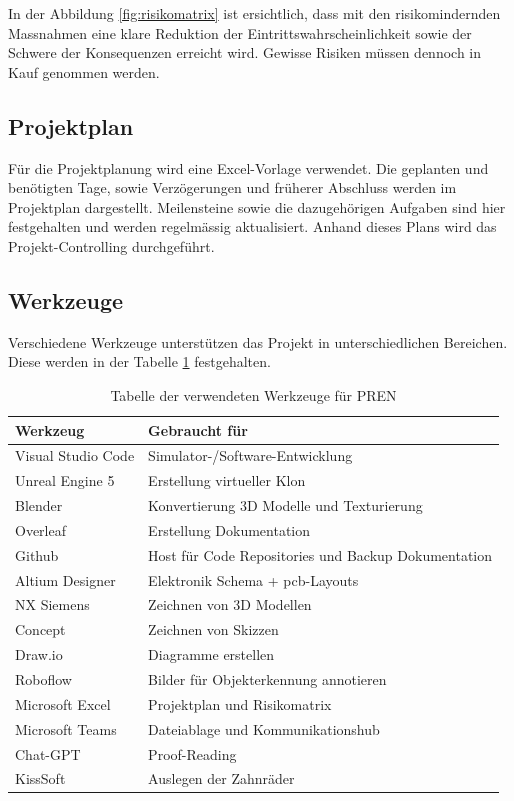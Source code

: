 \documentclass[../main.tex]{subfiles}
\begin{document}
In der Abbildung \ref{fig:risikomatrix} ist ersichtlich, dass mit den risikomindernden Massnahmen eine klare Reduktion der Eintrittswahrscheinlichkeit sowie der Schwere der Konsequenzen erreicht wird. Gewisse Risiken müssen dennoch in Kauf genommen werden.

\subsection{Projektplan}
Für die Projektplanung wird eine Excel-Vorlage verwendet. Die geplanten und benötigten Tage, sowie Verzögerungen und früherer Abschluss werden im Projektplan dargestellt. Meilensteine sowie die dazugehörigen Aufgaben sind hier festgehalten und werden regelmässig aktualisiert. Anhand dieses Plans wird das Projekt-Controlling durchgeführt.


\subsection{Werkzeuge}

Verschiedene Werkzeuge unterstützen das Projekt in unterschiedlichen Bereichen. Diese werden in der Tabelle \ref{tab:werkzeugtabelle} festgehalten.

\begin{table}[H]
\centering
\begin{tabular}{|l|l|}
\hline
\textbf{Werkzeug} & \textbf{Gebraucht für} \\ \hline
Visual Studio Code & Simulator-/Software-Entwicklung \\ \hline
Unreal Engine 5 & Erstellung virtueller Klon \\ \hline
Blender & Konvertierung 3D Modelle und Texturierung \\ \hline
Overleaf & Erstellung Dokumentation \\ \hline
Github & Host für Code Repositories und Backup Dokumentation \\ \hline
Altium Designer & Elektronik Schema + \acrshort{pcb}-Layouts \\ \hline
NX Siemens & Zeichnen von 3D Modellen \\ \hline
Concept & Zeichnen von Skizzen \\ \hline
Draw.io & Diagramme erstellen \\ \hline
Roboflow & Bilder für Objekterkennung annotieren \\ \hline
Microsoft Excel & Projektplan und Risikomatrix \\ \hline
Microsoft Teams & Dateiablage und Kommunikationshub \\ \hline
Chat-GPT & Proof-Reading \\ \hline
KissSoft & Auslegen der Zahnräder \\ \hline
 
\end{tabular}
\caption{Tabelle der verwendeten Werkzeuge für PREN}
\label{tab:werkzeugtabelle}
\end{table}
\end{document}
